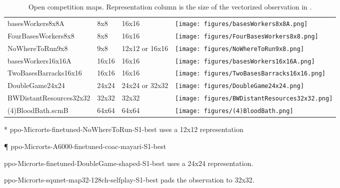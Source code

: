 \documentclass[conference]{IEEEtran}
\begin{document}
\begin{table}[H]
    \centering
    \begin{threeparttable}
        \caption{Open competition maps. Representation column is the size of the vectorized observation in \agentName.}
        \label{tab:open-maps}
            \begin{tabular}{>{\centering\arraybackslash}m{4cm}>{\centering\arraybackslash}m{2cm}>{\centering\arraybackslash}m{2cm}>{\centering\arraybackslash}m{2.25cm}}
                \multicolumn{1}{c}{\bf Name}  &\multicolumn{1}{c}{\bf Size}
                &\multicolumn{1}{c}{\bf Representation}
                &\multicolumn{1}{c}{\bf Start} \\ \hline
                basesWorkers8x8A & 8x8 & 16x16 &
                \texttt{[image: figures/basesWorkers8x8A.png]} \\
                FourBasesWorkers8x8 & 8x8 & 16x16 &
                \texttt{[image: figures/FourBasesWorkers8x8.png]} \\
                NoWhereToRun9x8 & 9x8 & 12x12\tnote{*} or 16x16\tnote{\P} &
                \texttt{[image: figures/NoWhereToRun9x8.png]} \\
                basesWorkers16x16A & 16x16 & 16x16 &
                \texttt{[image: figures/basesWorkers16x16A.png]} \\
                TwoBasesBarracks16x16 & 16x16 & 16x16 &
                \texttt{[image: figures/TwoBasesBarracks16x16.png]}
                \\
                DoubleGame24x24 & 24x24 & 24x24\tnote{\dag} or 32x32\tnote{\ddag} &
                \texttt{[image: figures/DoubleGame24x24.png]} \\
                BWDistantResources32x32 & 32x32 & 32x32 &
                \texttt{[image: figures/BWDistantResources32x32.png]}
                \\
                (4)BloodBath.scmB & 64x64 & 64x64 &
                \texttt{[image: figures/(4)BloodBath.png]} \\
            \end{tabular}
            \begin{tablenotes}
                \item[*] ppo-Microrts-finetuned-NoWhereToRun-S1-best uses a 12x12
                representation
                \item[\P] ppo-Microrts-A6000-finetuned-coac-mayari-S1-best
                \item[\dag] ppo-Microrts-finetuned-DoubleGame-shaped-S1-best uses a 24x24
                    representation.
                \item[\ddag] ppo-Microrts-squnet-map32-128ch-selfplay-S1-best pads the
                    observation to 32x32.
            \end{tablenotes}
    \end{threeparttable}
\end{table}
\end{document}
